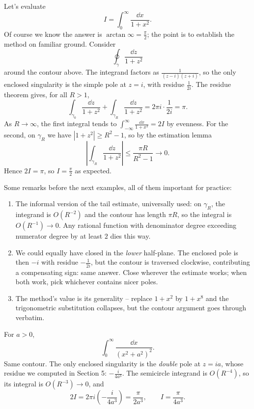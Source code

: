 \documentclass[a4paper]{scrartcl}
\begin{document}
\begin{example}
	Let's evaluate
	$$
	I = \int_0^\infty \frac{\dd x}{1 + x^2}.
	$$
	Of course we know the answer is $\arctan \infty = \frac{\pi}{2}$; the point is to establish the method on familiar ground. Consider
	$$
	\oint_\gamma \frac{\dd z}{1 + z^2}
	$$
	around the contour above. The integrand factors as $\frac{1}{(z-i)(z+i)}$, so the only enclosed singularity is the simple pole at $z = i$, with residue $\frac{1}{2i}$. The residue theorem gives, for all $R > 1$,
	$$
	\int_{\gamma_0} \frac{\dd z}{1 + z^2} + \int_{\gamma_R} \frac{\dd z}{1 + z^2} = 2\pi i \cdot \frac{1}{2i} = \pi.
	$$
	As $R \to \infty$, the first integral tends to $\int_{-\infty}^\infty \frac{\dd x}{1 + x^2} = 2I$ by evenness. For the second, on $\gamma_R$ we have $|1 + z^2| \geq R^2 - 1$, so by the estimation lemma
	$$
	\left|\int_{\gamma_R} \frac{\dd z}{1 + z^2}\right| \leq \frac{\pi R}{R^2 - 1} \to 0.
	$$
	Hence $2I = \pi$, so $I = \frac{\pi}{2}$ as expected.
\end{example}

Some remarks before the next examples, all of them important for practice:
\begin{enumerate}[label=(\roman*)]
	\item The informal version of the tail estimate, universally used: on $\gamma_R$, the integrand is $O(R^{-2})$ and the contour has length $\pi R$, so the integral is $O(R^{-1}) \to 0$. Any rational function with denominator degree exceeding numerator degree by at least $2$ dies this way.
	\item We could equally have closed in the \emph{lower} half-plane. The enclosed pole is then $-i$ with residue $-\frac{1}{2i}$, but the contour is traversed clockwise, contributing a compensating sign: same answer. Close wherever the estimate works; when both work, pick whichever contains nicer poles.
	\item The method's value is its generality -- replace $1 + x^2$ by $1 + x^8$ and the trigonometric substitution collapses, but the contour argument goes through verbatim.
\end{enumerate}

\begin{example}
	For $a > 0$,
	$$
	\int_0^\infty \frac{\dd x}{(x^2 + a^2)^2}.
	$$
	Same contour. The only enclosed singularity is the \emph{double} pole at $z = ia$, whose residue we computed in Section 5: $-\frac{i}{4a^3}$. The semicircle integrand is $O(R^{-4})$, so its integral is $O(R^{-3}) \to 0$, and
	$$
	2I = 2\pi i \left(-\frac{i}{4 a^3}\right) = \frac{\pi}{2a^3}, \qquad I = \frac{\pi}{4a^3}.
	$$
\end{example}
\end{document}
